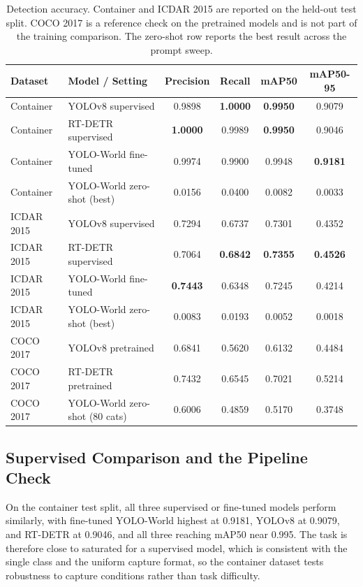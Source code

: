 \documentclass[conference]{IEEEtran}
\begin{document}
\begin{table}[tb]
\centering
\caption{Detection accuracy. Container and ICDAR 2015 are reported on the held-out test split. COCO 2017 is a reference check on the pretrained models and is not part of the training comparison. The zero-shot row reports the best result across the prompt sweep.}
\label{tab:main}
\begin{tabular}{llcccc}
\toprule
Dataset & Model / Setting & Precision & Recall & mAP50 & mAP50-95 \\
\midrule
Container & YOLOv8 supervised & 0.9898 & \textbf{1.0000} & \textbf{0.9950} & 0.9079 \\
Container & RT-DETR supervised & \textbf{1.0000} & 0.9989 & \textbf{0.9950} & 0.9046 \\
Container & YOLO-World fine-tuned & 0.9974 & 0.9900 & 0.9948 & \textbf{0.9181} \\
Container & YOLO-World zero-shot (best) & 0.0156 & 0.0400 & 0.0082 & 0.0033 \\
\midrule
ICDAR 2015 & YOLOv8 supervised & 0.7294 & 0.6737 & 0.7301 & 0.4352 \\
ICDAR 2015 & RT-DETR supervised & 0.7064 & \textbf{0.6842} & \textbf{0.7355} & \textbf{0.4526} \\
ICDAR 2015 & YOLO-World fine-tuned & \textbf{0.7443} & 0.6348 & 0.7245 & 0.4214 \\
ICDAR 2015 & YOLO-World zero-shot (best) & 0.0083 & 0.0193 & 0.0052 & 0.0018 \\
\midrule
COCO 2017 & YOLOv8 pretrained & 0.6841 & 0.5620 & 0.6132 & 0.4484 \\
COCO 2017 & RT-DETR pretrained & 0.7432 & 0.6545 & 0.7021 & 0.5214 \\
COCO 2017 & YOLO-World zero-shot (80 cats) & 0.6006 & 0.4859 & 0.5170 & 0.3748 \\
\bottomrule
\end{tabular}
\end{table}

\subsection{Supervised Comparison and the Pipeline Check}

On the container test split, all three supervised or fine-tuned models perform similarly, with fine-tuned YOLO-World highest at 0.9181, YOLOv8 at 0.9079, and RT-DETR at 0.9046, and all three reaching mAP50 near 0.995. The task is therefore close to saturated for a supervised model, which is consistent with the single class and the uniform capture format, so the container dataset tests robustness to capture conditions rather than task difficulty.
\end{document}
